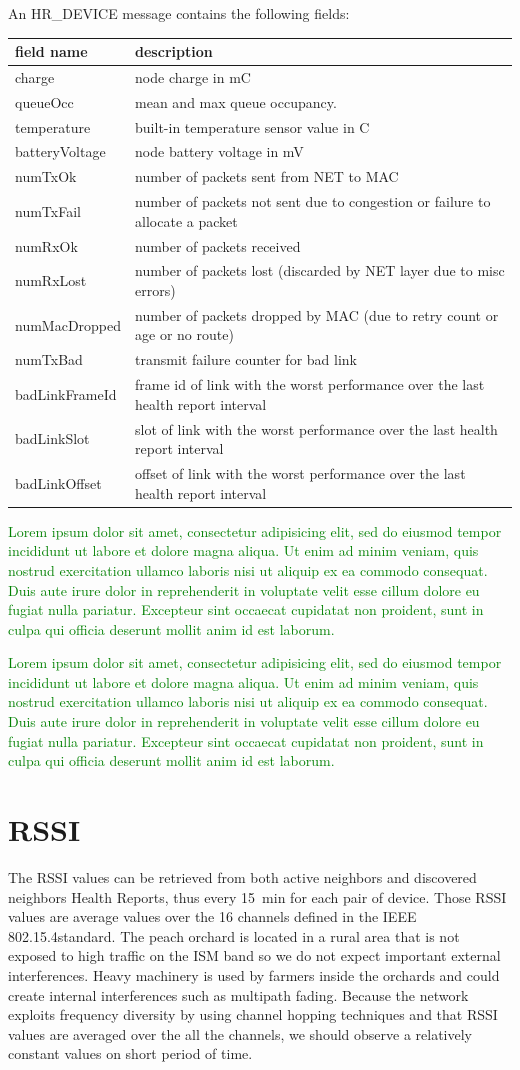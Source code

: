 \documentclass{sig-alternate}
\newcommand{\lorem}               {\textcolor{green}{Lorem ipsum dolor sit amet, consectetur adipisicing elit, sed do eiusmod tempor incididunt ut labore et dolore magna aliqua. Ut enim ad minim veniam, quis nostrud exercitation ullamco laboris nisi ut aliquip ex ea commodo consequat. Duis aute irure dolor in reprehenderit in voluptate velit esse cillum dolore eu fugiat nulla pariatur. Excepteur sint occaecat cupidatat non proident, sunt in culpa qui officia deserunt mollit anim id est laborum.}}
\begin{document}
An HR\_DEVICE message contains the following fields:
\begin{tabular}{l|p{6cm}}
    field name      & description\\
    \hline
    charge          & node charge in mC\\
    queueOcc        & mean and max queue occupancy.\\
    temperature     & built-in temperature sensor value in C\\
    batteryVoltage  & node battery voltage in mV\\
    numTxOk         & number of packets sent from NET to MAC\\
    numTxFail       & number of packets not sent due to congestion or failure to allocate a packet\\
    numRxOk         & number of packets received\\
    numRxLost       & number of packets lost (discarded by NET layer due to misc errors)\\
    numMacDropped   & number of packets dropped by MAC (due to retry count or age or no route)\\
    numTxBad        & transmit failure counter for bad link\\
    badLinkFrameId  & frame id of link with the worst performance over the last health report interval\\
    badLinkSlot     & slot of link with the worst performance over the last health report interval\\
    badLinkOffset   & offset of link with the worst performance over the last health report interval\\
\end{tabular}


\lorem


\lorem

\section{RSSI}
\label{sec:rssi}


The RSSI values can be retrieved from both active neighbors and discovered neighbors Health Reports, thus every 15~min for each pair of device.
Those RSSI values are average values over the 16 channels defined in the IEEE 802.15.4standard.
The peach orchard is located in a rural area that is not exposed to high traffic on the ISM band so we do not expect important external interferences.
Heavy machinery is used by farmers inside the orchards and could create internal interferences such as multipath fading.
Because the network exploits frequency diversity by using channel hopping techniques and that RSSI values are averaged over the all the channels, we should observe a relatively constant values on short period of time.
\end{document}
